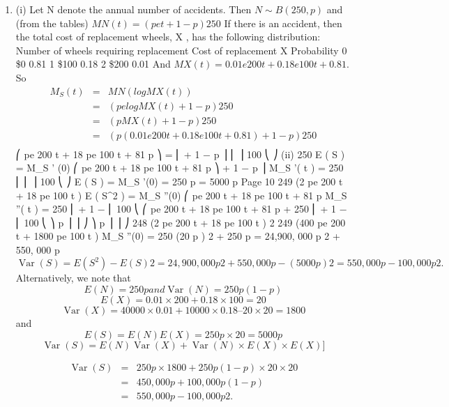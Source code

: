 \documentclass[a4paper,12pt]{article}
\begin{document}
\begin{enumerate}
\begin{enumerate}[(i)]
\end{enumerate}
\item %
(i)
Let N denote the annual number of accidents. Then $N \sim B (250, p )$ and (from the tables) $M N ( t ) = ( pe t + 1 − p ) 250$
If there is an accident, then the total cost of replacement wheels, X , has the following distribution:
Number of wheels requiring replacement
Cost of replacement X
Probability
0
\$0
0.81
1
\$100
0.18
2
\$200
0.01
And $M X ( t ) = 0.01 e 200 t + 0.18 e 100 t + 0.81$.
So
\begin{eqnarray*}
M_{S}  ( t ) &=& M N (log M X ( t ))\\
&=& ( pe log M X ( t ) + 1 − p ) 250\\
&=& ( pM X ( t ) + 1 − p ) 250\\
&=& ( p (0.01 e 200 t + 0.18 e 100 t + 0.81) + 1 − p ) 250\\
\end{eqnarray*}
⎛ pe 200 t + 18 pe 100 t + 81 p
⎞
= ⎜
+ 1 − p ⎟
⎜
⎟
100
⎝
⎠
(ii)
250
E ( S ) = M_{S}  ' (0)
⎛ pe 200 t + 18 pe 100 t + 81 p
⎞
+ 1 − p ⎟
M_{S}  '( t ) = 250 \times  ⎜
⎜
⎟
100
⎝
⎠
E ( S ) = M_{S}  '(0) = 250   p = 5000 p
Page 10
249
\times  (2 pe 200 t + 18 pe 100 t )
E ( S^{2} ) = M_{S}  ''(0)
⎛ pe 200 t + 18 pe 100 t + 81 p
M_{S}  ''( t ) = 250  \times  ⎜
+ 1 −
⎜
100
⎝
⎛ pe 200 t + 18 pe 100 t + 81 p
+ 250 \times  ⎜
+ 1 −
⎜
100
⎝
⎞
p ⎟
⎟
⎠
⎞
p ⎟
⎟
⎠
248
\times  (2 pe 200 t + 18 pe 100 t ) 2
249
\times  (400 pe 200 t + 1800 pe 100 t )
M_{S}  ''(0) = 250  \times  (20 p ) 2 + 250   p = 24,900, 000 p 2 + 550, 000 p
\[\operatorname{Var}( S ) = E ( S^{2} ) − E ( S ) 2 = 24,900, 000 p 2 + 550, 000 p − (5000 p ) 2 = 550, 000 p − 100, 000 p 2 .\]
Alternatively, we note that
\[E ( N ) = 250 p and \operatorname{Var}( N ) = 250 p (1 - p )\]
\[E ( X ) = 0.01 \times  200 + 0.18 \times  100 = 20\]
\[\operatorname{Var}( X ) = 40000 \times  0.01 + 10000 \times  0.18 – 20 \times  20 = 1800\]
and
\[E ( S ) = E ( N ) E ( X ) = 250 p \times  20 = 5000 p\]
\[\operatorname{Var}( S ) = E ( N ) \operatorname{Var}( X ) +\operatorname{Var}( N ) \times  E ( X ) \times  E ( X )]\]

\begin{eqnarray*}
\operatorname{Var}( S ) &=& 250 p \times  1800 + 250 p (1 - p ) \times  20 \times  20 \\
&=& 450,000 p + 100,000 p (1 - p ) \\ 
&=& 550,000 p - 100,000 p 2 .\\
\end{eqnarray*}


\end{enumerate}
\end{document}

